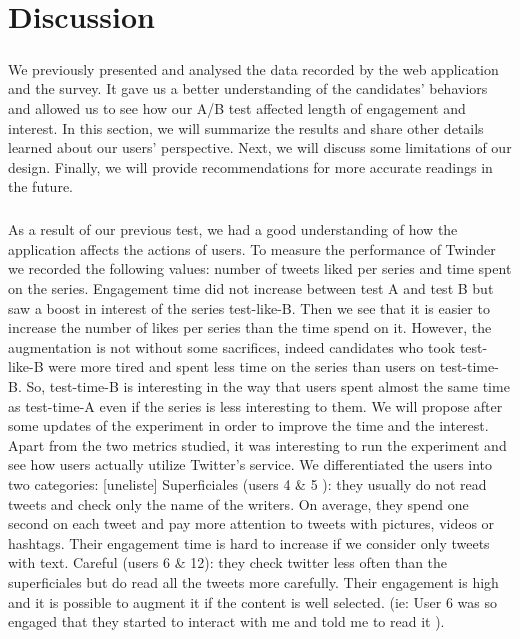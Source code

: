 \chapter{Discussion}

\paragraph{}
We previously presented and analysed the data recorded by the web application and the survey. It gave us a better understanding of the candidates' behaviors and allowed us to see how our A/B test affected length of engagement and interest. In this section, we will summarize the results and share other details learned about our users' perspective. Next, we will discuss some limitations of our design. Finally, we will provide recommendations for more accurate readings in the future.

\paragraph{}
As a result of our previous test, we had a good understanding of how the application affects the actions of users. To measure the performance of Twinder we recorded the following values: number of tweets liked per series and time spent on the series. Engagement time did not increase between test A and test B but saw a boost in interest of the series test-like-B. Then we see that it is easier to increase the number of likes per series than the time spend on it. However, the augmentation is not without some sacrifices, indeed candidates who took test-like-B were more tired and spent less time on the series than users on test-time-B. So, test-time-B is interesting in the way that users spent almost the same time as test-time-A even if the series is less interesting to them. We will propose after some updates of the experiment in order to improve the time and the interest. \\
Apart from the two metrics studied, it was interesting to run the experiment and see how users actually utilize Twitter's service. We differentiated the users into two categories: [uneliste]
Superficiales (users 4 \& 5 ): they usually do not read tweets and check only the name of the writers. On average, they spend one second on each tweet and pay more attention to tweets with pictures, videos or hashtags. Their engagement time is hard to increase if we consider only tweets with text.
Careful (users 6 \& 12): they check twitter less often than the superficiales but do read all the tweets more carefully. Their engagement is high and it is possible to augment it if the content is well selected. (ie: User 6 was so engaged that they started to interact with me and told me to read it ).

